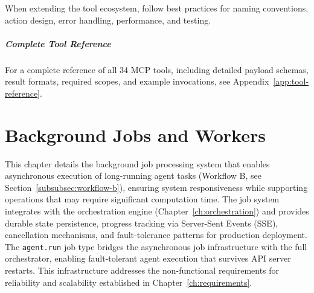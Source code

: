 \documentclass[a4paper,twoside]{sapthesis}
\begin{document}
When extending the tool ecosystem, follow best practices for naming conventions, action design, error handling, performance, and testing.

\paragraph{Complete Tool Reference}
For a complete reference of all 34 MCP tools, including detailed payload schemas, result formats, required scopes, and example invocations, see Appendix~\ref{app:tool-reference}.


\chapter{Background Jobs and Workers}
\label{ch:jobs-workers}

%

This chapter details the background job processing system that enables asynchronous execution of long-running agent tasks (Workflow B, see Section~\ref{subsubsec:workflow-b}), ensuring system responsiveness while supporting operations that may require significant computation time. The job system integrates with the orchestration engine (Chapter~\ref{ch:orchestration}) and provides durable state persistence, progress tracking via Server-Sent Events (SSE), cancellation mechanisms, and fault-tolerance patterns for production deployment. The \texttt{agent.run} job type bridges the asynchronous job infrastructure with the full orchestrator, enabling fault-tolerant agent execution that survives API server restarts. This infrastructure addresses the non-functional requirements for reliability and scalability established in Chapter~\ref{ch:requirements}.
\end{document}
